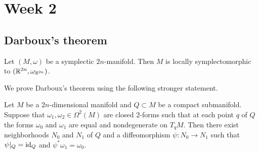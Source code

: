 \documentclass{amsart}
\begin{document}
\newpage
\section{Week 2}

\subsection{Darboux's theorem}

\begin{theorem}[Darboux]
    Let $(M,\omega)$ be a symplectic $2n$-manifold. Then $M$ is locally symplectomorphic to
    $(\mathbb{R}^{2n},\omega_{\mathbb{R}^{2n}})$.
\end{theorem}

We prove Darboux's theorem using the following stronger statement.

\begin{theorem}
    Let $M$ be a $2n$-dimensional manifold and $Q\subset M$ be a compact submanifold. Suppose that
    $\omega_1,\omega_2\in\Omega^2(M)$ are closed 2-forms such that at each point $q$ of $Q$ the forms
    $\omega_0$ and $\omega_1$ are equal and nondegenerate on $T_qM$. Then there exist neighborhoods
    $N_0$ and $N_1$ of $Q$ and a diffeomorphism $\psi:N_0\to N_1$ such that $\psi|_Q=\operatorname{id}_Q$ and
    $\psi^*\omega_1=\omega_0$.
    \label{thm:moser}
\end{theorem}
\end{document}

